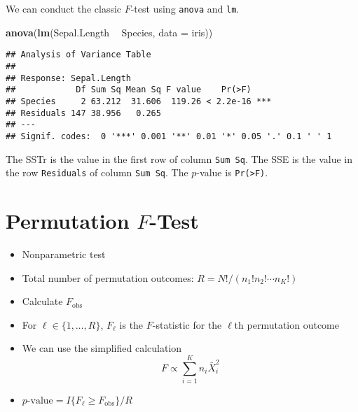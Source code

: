 \documentclass[
]{book}
\newenvironment{Shaded}{\begin{snugshade}}{\end{snugshade}}
\newcommand{\DataTypeTok}[1]{\textcolor[rgb]{0.13,0.29,0.53}{#1}}
\newcommand{\KeywordTok}[1]{\textcolor[rgb]{0.13,0.29,0.53}{\textbf{#1}}}
\newcommand{\NormalTok}[1]{#1}
\newcommand{\OperatorTok}[1]{\textcolor[rgb]{0.81,0.36,0.00}{\textbf{#1}}}
\newcommand{\StringTok}[1]{\textcolor[rgb]{0.31,0.60,0.02}{#1}}
\providecommand{\tightlist}{%
  \setlength{\itemsep}{0pt}\setlength{\parskip}{0pt}}
\begin{document}
We can conduct the classic \(F\)-test using \texttt{anova} and \texttt{lm}.

\begin{Shaded}
\begin{Highlighting}[]
\KeywordTok{anova}\NormalTok{(}\KeywordTok{lm}\NormalTok{(Sepal.Length }\OperatorTok{~}\StringTok{ }\NormalTok{Species, }\DataTypeTok{data =}\NormalTok{ iris))}
\end{Highlighting}
\end{Shaded}

\begin{verbatim}
## Analysis of Variance Table
## 
## Response: Sepal.Length
##            Df Sum Sq Mean Sq F value    Pr(>F)    
## Species     2 63.212  31.606  119.26 < 2.2e-16 ***
## Residuals 147 38.956   0.265                      
## ---
## Signif. codes:  0 '***' 0.001 '**' 0.01 '*' 0.05 '.' 0.1 ' ' 1
\end{verbatim}

The SSTr is the value in the first row of column \texttt{Sum\ Sq}.
The SSE is the value in the row \texttt{Residuals} of column \texttt{Sum\ Sq}.
The \(p\)-value is \texttt{Pr(\textgreater{}F)}.

\hypertarget{permutation-f-test}{%
\section{\texorpdfstring{Permutation \(F\)-Test}{Permutation F-Test}}\label{permutation-f-test}}

\begin{itemize}
\tightlist
\item
  Nonparametric test
\item
  Total number of permutation outcomes: \(R = N!/(n_1! n_2! \cdots n_K!)\)
\item
  Calculate \(F_{\mathrm{obs}}\)
\item
  For \(\ell \in \{1, \dots, R\}\),
  \(F_\ell\) is the \(F\)-statistic for the \(\ell\)th permutation outcome
\item
  We can use the simplified calculation
  \[F \propto \sum_{i=1}^K n_i \bar{X}_i^2\]
\item
  \(p\text{-value} = I\{F_\ell \geq F_{\mathrm{obs}}\} / R\)
\end{itemize}
\end{document}
